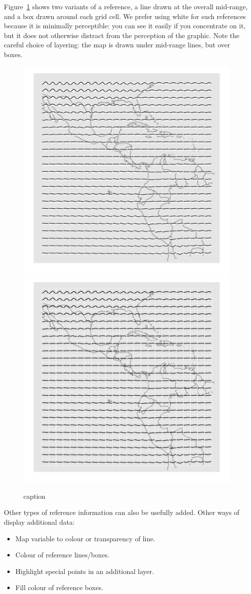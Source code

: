 \documentclass[oneside]{article}
\begin{document}
Figure~\ref{fig:ref-basic} shows two variants of a reference, a line drawn at the overall mid-range, and a box drawn around each grid cell. We prefer using white for such references because it is minimally perceptible: you can see it easily if you concentrate on it, but it does not otherwise distract from the perception of the graphic. Note the careful choice of layering: the map is drawn under mid-range lines, but over boxes.

\begin{figure}[htbp]
  \centering
  \includegraphics[width=0.5\linewidth]{ref-line}%
  \includegraphics[width=0.5\linewidth]{ref-box}
  \caption{caption}
  \label{fig:ref-basic}
\end{figure}

Other types of reference information can also be usefully added. 
Other ways of display additional data:

\begin{itemize}

  \item Map variable to colour or transparency of line. 
  
  \item Colour of reference lines/boxes.
  
  \item Highlight special points in an additional layer.

  \item Fill colour of reference boxes. 
  
\end{itemize}
\end{document}
